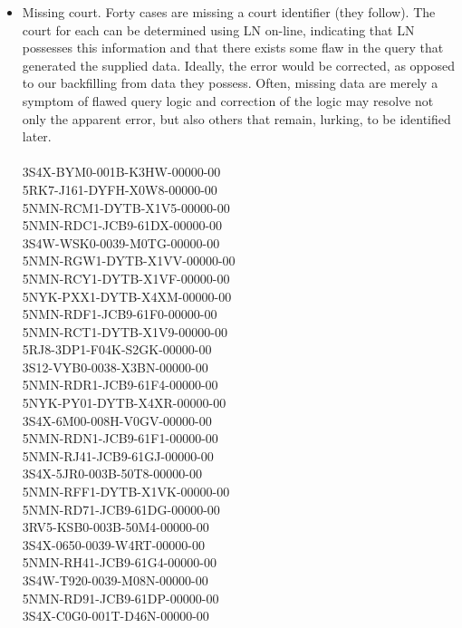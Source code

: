 \documentclass[10pt, letterpaper]{article}
\begin{document}
\begin{spacing}{1.0}
\begin{itemize}
    \item Missing court.  Forty cases are missing a court identifier (they follow).  The court for each can be determined using LN on-line, indicating that LN possesses this information and that there exists some flaw in the query that generated the supplied data.  Ideally, the error would be corrected, as opposed to our backfilling from data they possess.  Often, missing data are merely a symptom of flawed query logic and correction of the logic may resolve not only the apparent error, but also others that remain, lurking, to be identified later.\\\\
    3S4X-BYM0-001B-K3HW-00000-00\\
    5RK7-J161-DYFH-X0W8-00000-00\\
    5NMN-RCM1-DYTB-X1V5-00000-00\\
    5NMN-RDC1-JCB9-61DX-00000-00\\
    3S4W-WSK0-0039-M0TG-00000-00\\
    5NMN-RGW1-DYTB-X1VV-00000-00\\
    5NMN-RCY1-DYTB-X1VF-00000-00\\
    5NYK-PXX1-DYTB-X4XM-00000-00\\
    5NMN-RDF1-JCB9-61F0-00000-00\\
    5NMN-RCT1-DYTB-X1V9-00000-00\\
    5RJ8-3DP1-F04K-S2GK-00000-00\\
    3S12-VYB0-0038-X3BN-00000-00\\
    5NMN-RDR1-JCB9-61F4-00000-00\\
    5NYK-PY01-DYTB-X4XR-00000-00\\
    3S4X-6M00-008H-V0GV-00000-00\\
    5NMN-RDN1-JCB9-61F1-00000-00\\
    5NMN-RJ41-JCB9-61GJ-00000-00\\
    3S4X-5JR0-003B-50T8-00000-00\\
    5NMN-RFF1-DYTB-X1VK-00000-00\\
    5NMN-RD71-JCB9-61DG-00000-00\\
    3RV5-KSB0-003B-50M4-00000-00\\
    3S4X-0650-0039-W4RT-00000-00\\
    5NMN-RH41-JCB9-61G4-00000-00\\
    3S4W-T920-0039-M08N-00000-00\\
    5NMN-RD91-JCB9-61DP-00000-00\\
    3S4X-C0G0-001T-D46N-00000-00\\

\end{itemize}
\end{spacing}
\end{document}
